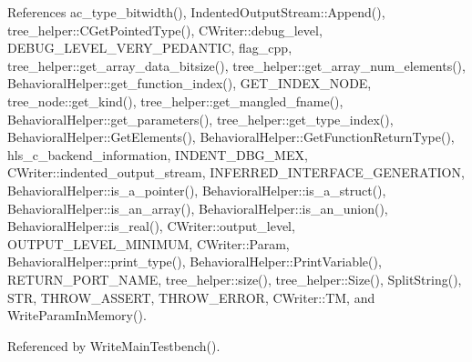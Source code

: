References ac\+\_\+type\+\_\+bitwidth(), Indented\+Output\+Stream\+::\+Append(), tree\+\_\+helper\+::\+C\+Get\+Pointed\+Type(), C\+Writer\+::debug\+\_\+level, D\+E\+B\+U\+G\+\_\+\+L\+E\+V\+E\+L\+\_\+\+V\+E\+R\+Y\+\_\+\+P\+E\+D\+A\+N\+T\+IC, flag\+\_\+cpp, tree\+\_\+helper\+::get\+\_\+array\+\_\+data\+\_\+bitsize(), tree\+\_\+helper\+::get\+\_\+array\+\_\+num\+\_\+elements(), Behavioral\+Helper\+::get\+\_\+function\+\_\+index(), G\+E\+T\+\_\+\+I\+N\+D\+E\+X\+\_\+\+N\+O\+DE, tree\+\_\+node\+::get\+\_\+kind(), tree\+\_\+helper\+::get\+\_\+mangled\+\_\+fname(), Behavioral\+Helper\+::get\+\_\+parameters(), tree\+\_\+helper\+::get\+\_\+type\+\_\+index(), Behavioral\+Helper\+::\+Get\+Elements(), Behavioral\+Helper\+::\+Get\+Function\+Return\+Type(), hls\+\_\+c\+\_\+backend\+\_\+information, I\+N\+D\+E\+N\+T\+\_\+\+D\+B\+G\+\_\+\+M\+EX, C\+Writer\+::indented\+\_\+output\+\_\+stream, I\+N\+F\+E\+R\+R\+E\+D\+\_\+\+I\+N\+T\+E\+R\+F\+A\+C\+E\+\_\+\+G\+E\+N\+E\+R\+A\+T\+I\+ON, Behavioral\+Helper\+::is\+\_\+a\+\_\+pointer(), Behavioral\+Helper\+::is\+\_\+a\+\_\+struct(), Behavioral\+Helper\+::is\+\_\+an\+\_\+array(), Behavioral\+Helper\+::is\+\_\+an\+\_\+union(), Behavioral\+Helper\+::is\+\_\+real(), C\+Writer\+::output\+\_\+level, O\+U\+T\+P\+U\+T\+\_\+\+L\+E\+V\+E\+L\+\_\+\+M\+I\+N\+I\+M\+UM, C\+Writer\+::\+Param, Behavioral\+Helper\+::print\+\_\+type(), Behavioral\+Helper\+::\+Print\+Variable(), R\+E\+T\+U\+R\+N\+\_\+\+P\+O\+R\+T\+\_\+\+N\+A\+ME, tree\+\_\+helper\+::size(), tree\+\_\+helper\+::\+Size(), Split\+String(), S\+TR, T\+H\+R\+O\+W\+\_\+\+A\+S\+S\+E\+RT, T\+H\+R\+O\+W\+\_\+\+E\+R\+R\+OR, C\+Writer\+::\+TM, and Write\+Param\+In\+Memory().



Referenced by Write\+Main\+Testbench().

